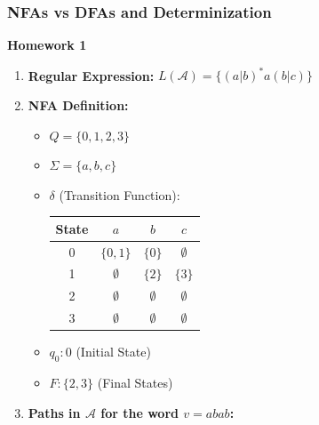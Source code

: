 \documentclass{article}
\theoremstyle{theorem}
\theoremstyle{definition}
\theoremstyle{remark}
\begin{document}
\subsubsection{NFAs vs DFAs and Determinization}

\textbf{Homework 1}

\begin{enumerate}
    \item \textbf{Regular Expression:} $L(\mathcal A) = \{(a|b)^* a (b|c)\}$
    
    \item \textbf{NFA Definition:}
    \begin{itemize}
        \item $Q = \{0, 1, 2, 3\}$
        \item $\Sigma = \{a, b, c\}$
        \item $\delta$ (Transition Function):
        
        \vspace{5pt}
        \begin{tabular}{|c|c|c|c|}
            \hline
            State & $a$ & $b$ & $c$ \\
            \hline
            0 & $\{0, 1\}$ & $\{0\}$ & $\emptyset$ \\
            \hline
            1 & $\emptyset$ & $\{2\}$ & $\{3\}$ \\
            \hline
            2 & $\emptyset$ & $\emptyset$ & $\emptyset$ \\
            \hline
            3 & $\emptyset$ & $\emptyset$ & $\emptyset$ \\
            \hline
        \end{tabular}
        \vspace{5pt}
        
        \item $q_0: 0$ (Initial State)
        \item $F: \{2, 3\}$ (Final States)
    \end{itemize}

    \item \textbf{Paths in $\mathcal A$ for the word $v = abab$:}
    
    \vspace{10pt}
\end{enumerate}
\end{document}
